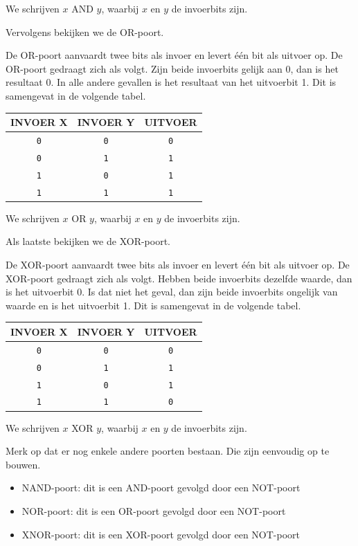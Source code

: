 We schrijven $x$ AND $y$, waarbij $x$ en $y$ de invoerbits zijn.

Vervolgens bekijken we de OR-poort.

De OR-poort aanvaardt twee bits als invoer en levert één bit als uitvoer op. De OR-poort gedraagt zich als volgt. Zijn beide invoerbits gelijk aan 0, dan is het resultaat 0. In alle andere gevallen is het resultaat van het uitvoerbit 1. Dit is samengevat in de volgende tabel.
\begin{center}
	\begin{tabular}{cc|c}
	  \hline
		INVOER X & INVOER Y & UITVOER \\ \hline		\texttt{0} & \texttt{0} & \texttt{0} \\ \hline		\texttt{0} & \texttt{1} & \texttt{1} \\ \hline		\texttt{1} & \texttt{0} & \texttt{1} \\ \hline		\texttt{1} & \texttt{1} & \texttt{1} \\ \hline
	\end{tabular}
\end{center}

We schrijven $x$ OR $y$, waarbij $x$ en $y$ de invoerbits zijn.

Als laatste bekijken we de XOR-poort.

De XOR-poort aanvaardt twee bits als invoer en levert één bit als uitvoer op. De XOR-poort gedraagt zich als volgt. Hebben beide invoerbits dezelfde waarde, dan is het uitvoerbit 0. Is dat niet het geval, dan zijn beide invoerbits ongelijk van waarde en is het uitvoerbit 1. Dit is samengevat in de volgende tabel.
\begin{center}
	\begin{tabular}{cc|c}
	  \hline
		INVOER X & INVOER Y & UITVOER \\ \hline		\texttt{0} & \texttt{0} & \texttt{0} \\ \hline		\texttt{0} & \texttt{1} & \texttt{1} \\ \hline		\texttt{1} & \texttt{0} & \texttt{1} \\ \hline		\texttt{1} & \texttt{1} & \texttt{0} \\ \hline
	\end{tabular}
\end{center}

We schrijven $x$ XOR $y$, waarbij $x$ en $y$ de invoerbits zijn.

Merk op dat er nog enkele andere poorten bestaan. Die zijn eenvoudig op te bouwen.
\begin{itemize}
  \item NAND-poort: dit is een AND-poort gevolgd door een NOT-poort  \item NOR-poort: dit is een OR-poort gevolgd door een NOT-poort  \item XNOR-poort: dit is een XOR-poort gevolgd door een NOT-poort
\end{itemize}

